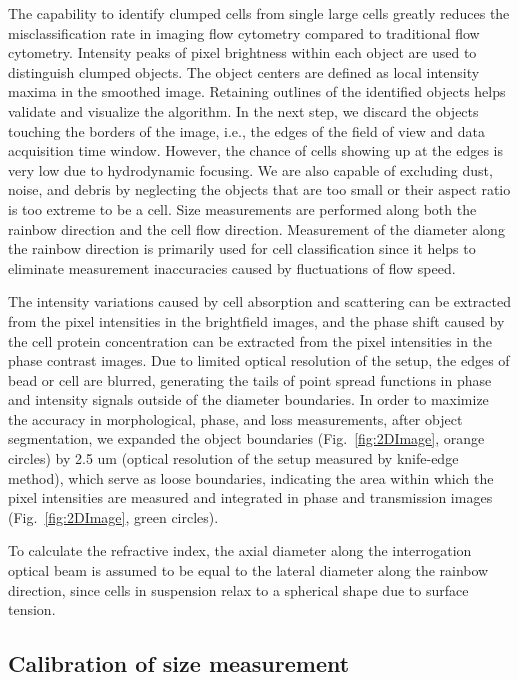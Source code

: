 \documentclass[aps,pra,reprint,superscriptaddress]{revtex4-1}
\begin{document}
The capability to identify clumped cells from single large cells greatly reduces the misclassification rate in imaging flow cytometry compared to traditional flow cytometry. Intensity peaks of pixel brightness within each object are used to distinguish clumped objects. The object centers are defined as local intensity maxima in the smoothed image. Retaining outlines of the identified objects helps validate and visualize the algorithm. In the next step, we discard the objects touching the borders of the image, i.e., the edges of the field of view and data acquisition time window. However, the chance of cells showing up at the edges is very low due to hydrodynamic focusing. We are also capable of excluding dust, noise, and debris by neglecting the objects that are too small or their aspect ratio is too extreme to be a cell. Size measurements are performed along both the rainbow direction and the cell flow direction. Measurement of the diameter along the rainbow direction is primarily used for cell classification since it helps to eliminate measurement inaccuracies caused by fluctuations of flow speed. 

The intensity variations caused by cell absorption and scattering can be extracted from the pixel intensities in the brightfield images, and the phase shift caused by the cell protein concentration can be extracted from the pixel intensities in the phase contrast images. Due to limited optical resolution of the setup, the edges of bead or cell are blurred, generating the tails of point spread functions in phase and intensity signals outside of the diameter boundaries. In order to maximize the accuracy in morphological, phase, and loss measurements, after object segmentation, we expanded the object boundaries (Fig.~\ref{fig:2DImage}, orange circles) by 2.5 um (optical resolution of the setup measured by knife-edge method), which serve as loose boundaries, indicating the area within which the pixel intensities are measured and integrated in phase and transmission images (Fig.~\ref{fig:2DImage}, green circles).

To calculate the refractive index, the axial diameter along the interrogation optical beam is assumed to be equal to the lateral diameter along the rainbow direction, since cells in suspension relax to a spherical shape due to surface tension.

\subsection{Calibration of size measurement}
\end{document}
